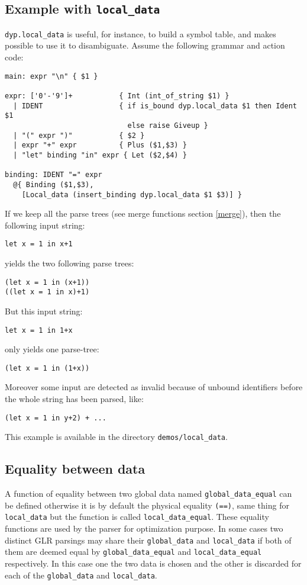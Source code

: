 \documentclass[12pt]{article}
\begin{document}
{\subsection{Example with \texttt{local\_data}}

\texttt{dyp.local\_data} is useful, for instance, to build a symbol table, and makes possible to use it to disambiguate. Assume the following grammar and action code:
\begin{verbatim}
main: expr "\n" { $1 }

expr: ['0'-'9']+           { Int (int_of_string $1) }
  | IDENT                  { if is_bound dyp.local_data $1 then Ident $1
                             else raise Giveup }
  | "(" expr ")"           { $2 }
  | expr "+" expr          { Plus ($1,$3) }
  | "let" binding "in" expr { Let ($2,$4) }

binding: IDENT "=" expr
  @{ Binding ($1,$3),
    [Local_data (insert_binding dyp.local_data $1 $3)] }
\end{verbatim}
If we keep all the parse trees (see merge functions section \ref{merge}), then the following input string: \begin{verbatim}
let x = 1 in x+1
\end{verbatim}
yields the two following parse trees:
\begin{verbatim}
(let x = 1 in (x+1))
((let x = 1 in x)+1)
\end{verbatim}
But this input string:
\begin{verbatim}
let x = 1 in 1+x
\end{verbatim}
only yields one parse-tree:
\begin{verbatim}
(let x = 1 in (1+x))
\end{verbatim}
Moreover some input are detected as invalid because of unbound identifiers before the whole string has been parsed, like:
\begin{verbatim}
(let x = 1 in y+2) + ...
\end{verbatim}
This example is available in the directory \texttt{demos/local\_data}.

\subsection{Equality between data}

A function of equality between two global data named \verb|global_data_equal| can be defined otherwise it is by default the physical equality \texttt{(==)}, same thing for \verb|local_data| but the function is called \verb|local_data_equal|. These equality functions are used by the parser for optimization purpose. In some cases two distinct GLR parsings may share their \verb|global_data| and \verb|local_data| if both of them are deemed equal by \verb|global_data_equal| and \verb|local_data_equal| respectively. In this case one the two data is chosen and the other is discarded for each of the \verb|global_data| and \verb|local_data|.

}
\end{document}
